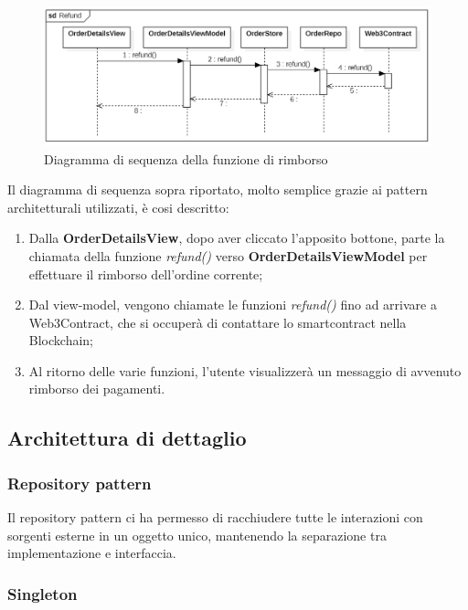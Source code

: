 \begin{figure}[H]
    \centering
    \includegraphics[scale = 0.6]{immagini/refund.png}
    \caption{Diagramma di sequenza della funzione di rimborso}
\end{figure}

Il diagramma di sequenza sopra riportato, molto semplice grazie ai pattern architetturali utilizzati, è cosi descritto:

\begin{enumerate}
    \item Dalla \textbf{OrderDetailsView}, dopo aver cliccato l'apposito bottone, parte la chiamata della funzione \textit{refund()} verso \textbf{OrderDetailsViewModel} per effettuare il rimborso dell'ordine corrente;
    \item Dal view-model, vengono chiamate le funzioni \textit{refund()} fino ad arrivare a Web3Contract, che si occuperà di contattare lo smartcontract nella Blockchain;
    \item Al ritorno delle varie funzioni, l'utente visualizzerà un messaggio di avvenuto rimborso dei pagamenti.
\end{enumerate}

\clearpage
\subsection{Architettura di dettaglio}

\subsubsection{Repository pattern}

Il repository pattern ci ha permesso di racchiudere tutte le interazioni con sorgenti esterne in un oggetto unico, mantenendo la separazione tra implementazione e interfaccia.

\subsubsection{Singleton}

